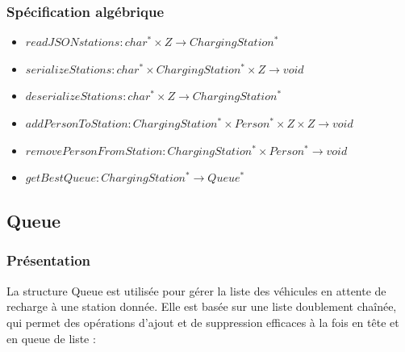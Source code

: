 \documentclass[french,a4paper]{article}
\begin{document}
\subsubsection{Spécification algébrique}

\begin{itemize}
    \item $readJSONstations : char^* \times {Z} \rightarrow ChargingStation^*$
    \item $serializeStations : char^* \times ChargingStation^* \times {Z} \rightarrow void$
    \item $deserializeStations : char^* \times {Z} \rightarrow ChargingStation^*$
    \item $addPersonToStation : ChargingStation^* \times Person^* \times {Z} \times {Z} \rightarrow void$
    \item $removePersonFromStation : ChargingStation^* \times Person^* \rightarrow void$
    \item $getBestQueue : ChargingStation^* \rightarrow Queue^*$
\end{itemize}


\subsection{Queue}

\subsubsection{Présentation}
La structure Queue est utilisée pour gérer la liste des véhicules en attente de recharge à une station donnée. Elle est basée sur une liste doublement chaînée, qui permet des opérations d'ajout et de suppression efficaces à la fois en tête et en queue de liste :

\begin{center}
\end{center}
\end{document}
